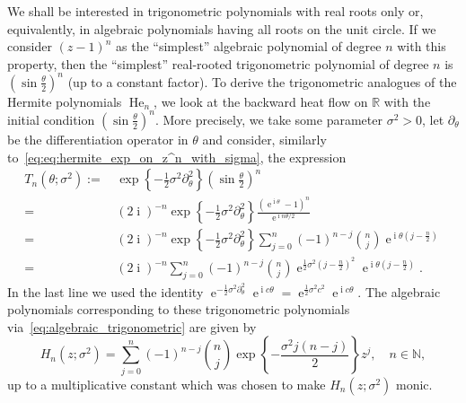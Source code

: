 \documentclass[AHL,Unicode,longabstracts,published]{cedram}
\DeclareMathOperator*{\He}{He}
\DeclareMathOperator{\eee}{e}
\DeclareMathOperator{\ii}{i}
\newcommand{\R}{\mathbb{R}}
\newcommand{\N}{\mathbb{N}}
\begin{document}
We shall be interested in trigonometric polynomials with real roots only or, equivalently, in algebraic polynomials having all roots on the unit circle. If we consider $(z-1)^n$ as the ``simplest'' algebraic polynomial of degree $n$ with this property, then the ``simplest'' real-rooted trigonometric polynomial of degree $n$ is $(\sin \frac \theta 2)^{n}$ (up to a constant factor). To derive the trigonometric analogues of the Hermite polynomials $\He_n$, we look at the backward heat flow on $\R$ with the initial condition $(\sin \frac \theta 2)^{n}$. More precisely, we take some parameter $\sigma^2>0$, let $\partial_\theta$ be the differentiation operator in $\theta$ and consider, similarly to~\eqref{eq:eq:hermite_exp_on_z^n_with_sigma}, the expression
\begin{equation}\label{eq:exp_diff_sin_theta_power}
\begin{split}
T_n(\theta; \sigma^2) {:=}&\, \exp\left\{-\frac{1}{2}\sigma^2 \partial_\theta^2\right\} \left(\sin \frac \theta 2\right)^{n}\\
=&\,(2\ii)^{-n} \exp\left\{-\frac{1}{2}\sigma^2 \partial_\theta^2\right\} \frac{(\eee^{\ii \theta} - 1)^n}{\eee^{\ii n \theta/2}}\\
=&\,(2\ii)^{-n} \exp\left\{-\frac{1}{2}\sigma^2 \partial_\theta^2\right\}\sum_{j=0}^n (-1)^{n-j} \binom nj \eee^{\ii \theta \left(j - \frac n2\right)}\\
=&\,(2\ii)^{-n} \sum_{j=0}^n (-1)^{n-j} \binom nj \eee^{\frac 12 \sigma^2 \left(j-\frac n2\right)^2} \eee^{\ii \theta \left(j - \frac n2\right)}.
\end{split}
\end{equation}
In the last line we used the identity $\eee^{-\frac 12 \sigma^2 \partial_\theta^2} \eee^{\ii c \theta} = \eee^{\frac 12 \sigma^2 c^2} \eee^{\ii c \theta}$. The algebraic polynomials corresponding to these trigonometric polynomials via~\eqref{eq:algebraic_trigonometric} are given by
\begin{equation}\label{eq:hermite_poly_circ_def1}
H_n(z;\sigma^2) =
\sum_{j=0}^n (-1)^{n-j} \binom nj \exp\left\{ - \frac {\sigma^2 j (n-j)}{2}\right\} z^j,
\quad n\in \N,
\end{equation}
up to a multiplicative constant which was chosen to make $H_n(z;\sigma^2)$ monic.
\end{document}
